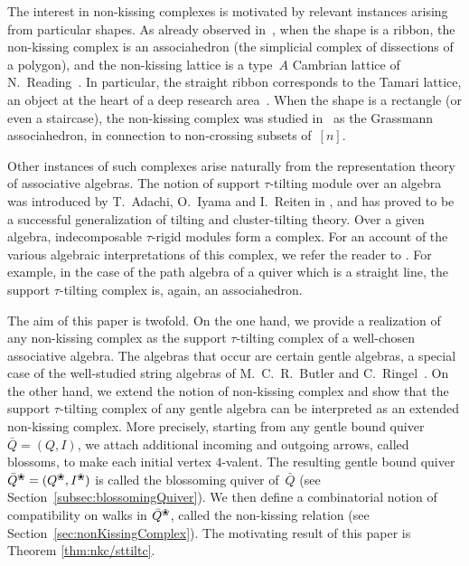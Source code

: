 \documentclass{memo-l}
\theoremstyle{definition}
\newcommand{\blossom}{^\text{\ding{96}}} %
\begin{document}
The interest in non-kissing complexes is motivated by relevant instances arising from particular shapes.
As already observed in~\cite[Sect.~10]{McConville}, when the shape is a ribbon, the non-kissing complex is an associahedron (the simplicial complex of dissections of a polygon), and the non-kissing lattice is a type~$A$ Cambrian lattice of N.~Reading~\cite{Reading-CambrianLattices}.
In particular, the straight ribbon corresponds to the Tamari lattice, an object at the heart of a deep research area~\cite{TamariFestschrift}.
When the shape is a rectangle (or even a staircase), the non-kissing complex was studied in~\cite{PetersenPylyavskyySpeyer, SantosStumpWelker} as the Grassmann associahedron, in connection to non-crossing subsets of~$[n]$.

Other instances of such complexes arise naturally from the representation theory of associative algebras.  
The notion of support $\tau$-tilting module over an algebra was introduced by T.~Adachi, O.~Iyama and I.~Reiten in \cite{AdachiIyamaReiten}, and has proved to be a successful generalization of tilting and cluster-tilting theory.  
Over a given algebra, indecomposable $\tau$-rigid modules form a complex. 
For an account of the various algebraic interpretations of this complex, we refer the reader to \cite{BrustleYang}.  
For example, in the case of the path algebra of a quiver which is a straight line, the support $\tau$-tilting complex is, again, an associahedron.

The aim of this paper is twofold.
On the one hand, we provide a realization of any non-kissing complex as the support $\tau$-tilting complex of a well-chosen associative algebra.
The algebras that occur are certain gentle algebras, a special case of the well-studied string algebras of M.~C.~R.~Butler and C.~Ringel~\cite{ButlerRingel}.
On the other hand, we extend the notion of non-kissing complex and show that the support \mbox{$\tau$-tilting} complex of any gentle algebra can be interpreted as an extended non-kissing complex.
More precisely, starting from any gentle bound quiver~$\bar Q = (Q,I)$, we attach additional incoming and outgoing arrows, called blossoms, to make each initial vertex \mbox{$4$-valent}. The resulting gentle bound quiver~$\bar Q\blossom = (Q\blossom, I\blossom)$ is called the blossoming quiver of~$\bar Q$ (see Section~\ref{subsec:blossomingQuiver}). 
We then define a combinatorial notion of compatibility on walks in $\bar Q \blossom$, called the non-kissing relation (see Section~\ref{sec:nonKissingComplex}).
The motivating result of this paper is Theorem \ref{thm:nkc/sttiltc}.
\end{document}
